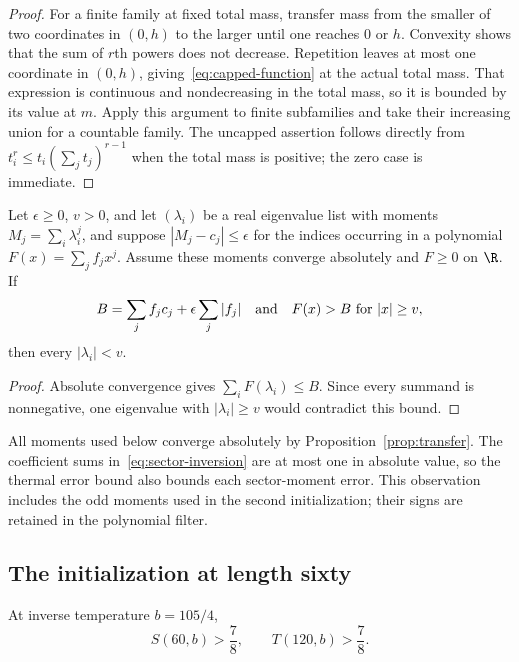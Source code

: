 \begin{proof}
For a finite family at fixed total mass, transfer mass from the smaller of two
coordinates in $(0,h)$ to the larger until one reaches $0$ or $h$.  Convexity
shows that the sum of $r$th powers does not decrease.  Repetition leaves at most
one coordinate in $(0,h)$, giving~\eqref{eq:capped-function} at the actual
total mass.  That expression is continuous and nondecreasing in the total
mass, so it is bounded by its value at $m$.  Apply this argument to finite
subfamilies and take their increasing union for a countable family.  The
uncapped assertion follows directly from
$t_i^r\le t_i(\sum_jt_j)^{r-1}$ when the total mass is positive; the zero case
is immediate.
\end{proof}

\begin{lemma}\label{lem:polynomial-filter}
Let $\epsilon\ge0$, $v>0$, and let $(\lambda_i)$ be a real eigenvalue list with moments
$M_j=\sum_i\lambda_i^j$, and suppose $|M_j-c_j|\le\epsilon$ for the
indices occurring in a polynomial $F(x)=\sum_j f_jx^j$.
Assume these moments converge absolutely and $F\ge0$ on $\R$.
If
\[
 B=\sum_j f_jc_j+\epsilon\sum_j|f_j|
 \quad\hbox{and}\quad F(x)>B\ \hbox{for }|x|\ge v,
\]
then every $|\lambda_i|<v$.
\end{lemma}

\begin{proof}
Absolute convergence gives $\sum_iF(\lambda_i)\le B$.  Since every summand
is nonnegative, one eigenvalue with $|\lambda_i|\ge v$ would contradict this
bound.
\end{proof}

All moments used below converge absolutely by Proposition~\ref{prop:transfer}.
The coefficient sums in~\eqref{eq:sector-inversion} are at most one in
absolute value, so the thermal error bound also bounds each sector-moment
error.  This observation includes the odd moments used in the second
initialization; their signs are retained in the polynomial filter.

\subsection{The initialization at length sixty}

\begin{proposition}\label{prop:seed60}
At inverse temperature $b=105/4$,
\[
 S(60,b)>\frac78,\qquad T(120,b)>\frac78.
\]
\end{proposition}

